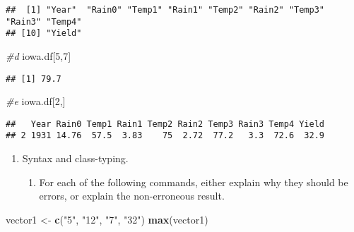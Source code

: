 \documentclass[
]{article}
\newenvironment{Shaded}{\begin{snugshade}}{\end{snugshade}}
\newcommand{\CommentTok}[1]{\textcolor[rgb]{0.56,0.35,0.01}{\textit{#1}}}
\newcommand{\DecValTok}[1]{\textcolor[rgb]{0.00,0.00,0.81}{#1}}
\newcommand{\KeywordTok}[1]{\textcolor[rgb]{0.13,0.29,0.53}{\textbf{#1}}}
\newcommand{\NormalTok}[1]{#1}
\newcommand{\StringTok}[1]{\textcolor[rgb]{0.31,0.60,0.02}{#1}}
\providecommand{\tightlist}{%
  \setlength{\itemsep}{0pt}\setlength{\parskip}{0pt}}
\begin{document}
\begin{Shaded}
\end{Shaded}

\begin{verbatim}
##  [1] "Year"  "Rain0" "Temp1" "Rain1" "Temp2" "Rain2" "Temp3" "Rain3" "Temp4"
## [10] "Yield"
\end{verbatim}

\begin{Shaded}
\begin{Highlighting}[]
\CommentTok{#d}
\NormalTok{iowa.df[}\DecValTok{5}\NormalTok{,}\DecValTok{7}\NormalTok{]}
\end{Highlighting}
\end{Shaded}

\begin{verbatim}
## [1] 79.7
\end{verbatim}

\begin{Shaded}
\begin{Highlighting}[]
\CommentTok{#e}
\NormalTok{iowa.df[}\DecValTok{2}\NormalTok{,]}
\end{Highlighting}
\end{Shaded}

\begin{verbatim}
##   Year Rain0 Temp1 Rain1 Temp2 Rain2 Temp3 Rain3 Temp4 Yield
## 2 1931 14.76  57.5  3.83    75  2.72  77.2   3.3  72.6  32.9
\end{verbatim}

\begin{enumerate}
\def\labelenumi{\arabic{enumi}.}
\setcounter{enumi}{1}
\tightlist
\item
  Syntax and class-typing.

  \begin{enumerate}
  \def\labelenumii{\alph{enumii}.}
  \tightlist
  \item
    For each of the following commands, either explain why they should
    be errors, or explain the non-erroneous result.
  \end{enumerate}
\end{enumerate}

\begin{Shaded}
\begin{Highlighting}[]
\NormalTok{vector1 <-}\StringTok{ }\KeywordTok{c}\NormalTok{(}\StringTok{"5"}\NormalTok{, }\StringTok{"12"}\NormalTok{, }\StringTok{"7"}\NormalTok{, }\StringTok{"32"}\NormalTok{)}
\KeywordTok{max}\NormalTok{(vector1)}
\end{Highlighting}
\end{Shaded}
\end{document}
